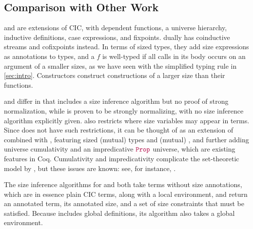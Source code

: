 \subsection{Comparison with Other Work}

\CIChat and \CIChatminus are extensions of CIC, with dependent functions, a universe hierarchy, inductive definitions, case expressions, and fixpoints.
\CChatomega dually has coinductive streams and cofixpoints instead.
In terms of sized types, they add size expressions as annotations to \coinductive types,
and a \cofixpoint $f$ is well-typed if all \corecursive calls in its body occurs on an argument of a smaller sizes,
as we have seen with the simplified typing rule in \autoref{sec:intro}.
Constructors construct constructions of a larger size than their \corecursive functions.

\CIChat and \CIChatminus differ in that \CIChat includes a size inference algorithm but no proof of strong normalization,
while \CIChatminus is proven to be strongly normalizing, with no size inference algorithm explicitly given.
\CIChatminus also restricts where size variables may appear in terms.
Since \lang does not have such restrictions, it can be thought of as an extension of \CIChat combined with \CChatomega,
featuring sized (mutual) \coinductive types and (mutual) \cofixpoints,
and further adding universe cumulativity and an impredicative $\Prop$ universe,
which are existing features in Coq.
Cumulativity and impredicativity complicate the set-theoretic model by \citet{cic-hat-minus}, but these issues are known: see, for instance, \citet{not-so-simple-cc}.

The size inference algorithms for \CIChat and \lang both take terms without size annotations,
which are in essence plain CIC terms, along with a local environment,
and return an annotated term, its annotated size, and a set of size constraints that must be satisfied.
Because \lang includes global definitions, its algorithm also takes a global environment.

\iffalse
Important to note is that size variables are not explicitly bound anywhere, and are effectively global.
For instance, $\Nat^{\upsilon_1} \rightarrow \Nat^\infty \rightarrow \Nat^{\succ{\upsilon}_2}$ is a valid (and well-typed) term in an empty environment, with no relation between the sizes $\upsilon_1$ and $\succ{\upsilon}_2$.

Sizes may be related to one another by a subsizing relation, which is a reflexive partial order on sizes,
with $s \sqsubseteq \succ{s}$ and the $\infty$ size being greater than all sizes.
The subsizing relation extends subtyping by inducing a covariant subtyping relation on inductive types and a contravariant one on coinductive types; that is,
if $r \sqsubseteq s$ and $I$ is inductive, then $I^r \leq I^s$,
and if $I$ is coinductive, then $I^s \leq I^r$.
We examine the syntax and judgements of \lang in detail in \autoref{sec:typing}.
\fi

